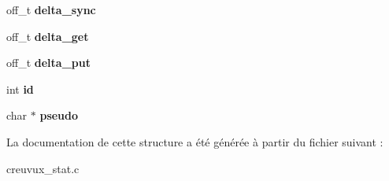 \begin{DoxyCompactItemize}
\item 
\hypertarget{struct_ustat_a7c635cefbb493edf51b79de8eeb124a4}{off\-\_\-t {\bfseries delta\-\_\-sync}}\label{struct_ustat_a7c635cefbb493edf51b79de8eeb124a4}

\item 
\hypertarget{struct_ustat_ae990bbd9de85dc9b07f89cc0bf764a1f}{off\-\_\-t {\bfseries delta\-\_\-get}}\label{struct_ustat_ae990bbd9de85dc9b07f89cc0bf764a1f}

\item 
\hypertarget{struct_ustat_a6603d2618d97f072f639a298848afa9a}{off\-\_\-t {\bfseries delta\-\_\-put}}\label{struct_ustat_a6603d2618d97f072f639a298848afa9a}

\item 
\hypertarget{struct_ustat_a7441ef0865bcb3db9b8064dd7375c1ea}{int {\bfseries id}}\label{struct_ustat_a7441ef0865bcb3db9b8064dd7375c1ea}

\item 
\hypertarget{struct_ustat_aa2f400385a61d54bb9c32f4d706ad0ce}{char $\ast$ {\bfseries pseudo}}\label{struct_ustat_aa2f400385a61d54bb9c32f4d706ad0ce}

\end{DoxyCompactItemize}


La documentation de cette structure a été générée à partir du fichier suivant \-:\begin{DoxyCompactItemize}
\item 
creuvux\-\_\-stat.\-c\end{DoxyCompactItemize}
